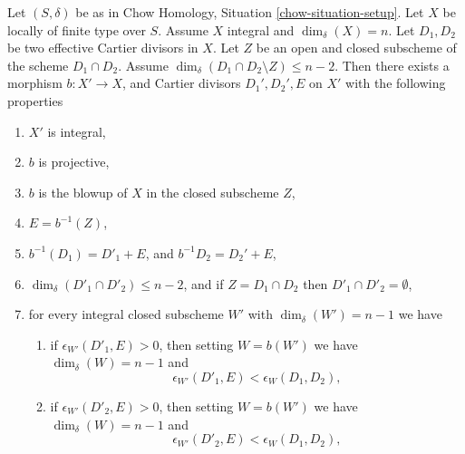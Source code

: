\begin{lemma}
\label{lemma-two-divisors}
Let $(S, \delta)$ be as in Chow Homology, Situation \ref{chow-situation-setup}.
Let $X$ be locally of finite type over $S$.
Assume $X$ integral and $\dim_\delta(X) = n$.
Let $D_1, D_2$ be two effective Cartier divisors in $X$.
Let $Z$ be an open and closed subscheme of the scheme $D_1 \cap D_2$.
Assume $\dim_\delta(D_1 \cap D_2 \setminus Z) \leq n - 2$.
Then there exists a morphism
$b : X' \to X$, and Cartier divisors
$D_1', D_2', E$ on $X'$ with the following properties
\begin{enumerate}
\item $X'$ is integral,
\item $b$ is projective,
\item $b$ is the blowup of $X$ in the closed subscheme $Z$,
\item $E = b^{-1}(Z)$,
\item $b^{-1}(D_1) = D'_1 + E$, and $b^{-1}D_2 = D_2' + E$,
\item $\dim_\delta(D'_1 \cap D'_2) \leq n - 2$, and if
$Z = D_1 \cap D_2$ then $D'_1 \cap D'_2 = \emptyset$,
\item for every integral closed subscheme $W'$
with $\dim_\delta(W') = n - 1$ we have
\begin{enumerate}
\item if $\epsilon_{W'}(D'_1, E) > 0$, then setting
$W = b(W')$ we have
$\dim_\delta(W) = n - 1$ and
$$
\epsilon_{W'}(D'_1, E) < \epsilon_W(D_1, D_2),
$$
\item if $\epsilon_{W'}(D'_2, E) > 0$, then setting
$W = b(W')$ we have
$\dim_\delta(W) = n - 1$ and
$$
\epsilon_{W'}(D'_2, E) < \epsilon_W(D_1, D_2),
$$
\end{enumerate}
\end{enumerate}
\end{lemma}

